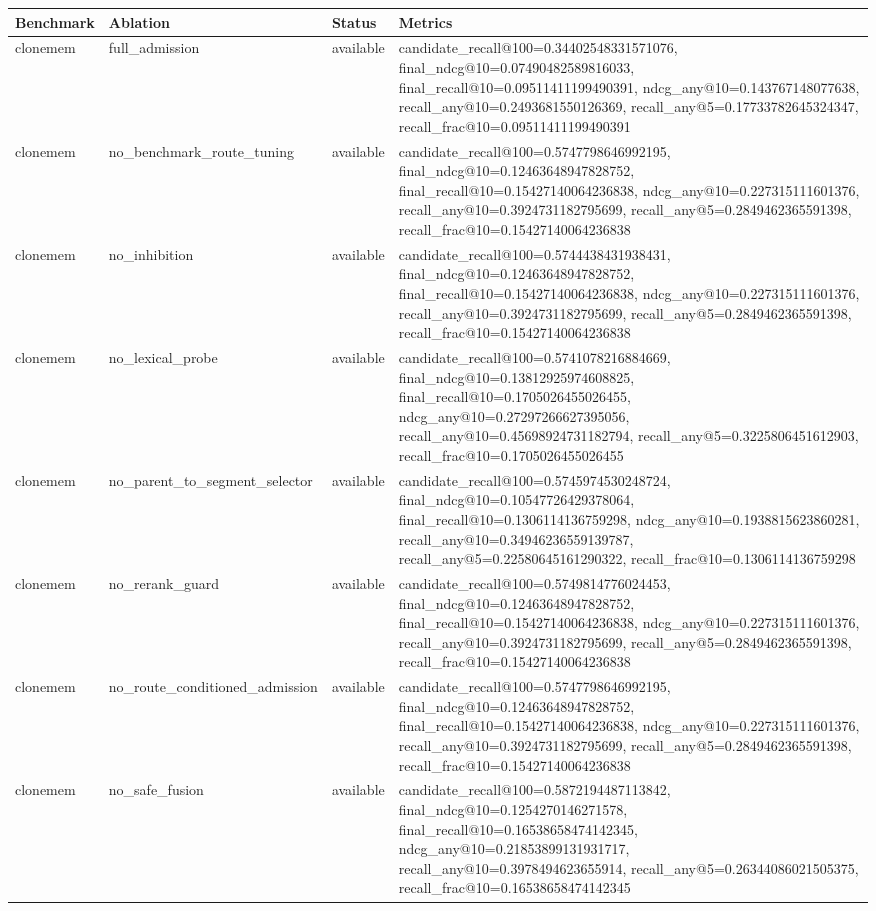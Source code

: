 \begin{tabular}{llll}
\toprule
Benchmark & Ablation & Status & Metrics \\
\midrule
clonemem & full_admission & available & candidate_recall@100=0.34402548331571076, final_ndcg@10=0.07490482589816033, final_recall@10=0.09511411199490391, ndcg_any@10=0.143767148077638, recall_any@10=0.2493681550126369, recall_any@5=0.17733782645324347, recall_frac@10=0.09511411199490391 \\
clonemem & no_benchmark_route_tuning & available & candidate_recall@100=0.5747798646992195, final_ndcg@10=0.12463648947828752, final_recall@10=0.15427140064236838, ndcg_any@10=0.227315111601376, recall_any@10=0.3924731182795699, recall_any@5=0.2849462365591398, recall_frac@10=0.15427140064236838 \\
clonemem & no_inhibition & available & candidate_recall@100=0.5744438431938431, final_ndcg@10=0.12463648947828752, final_recall@10=0.15427140064236838, ndcg_any@10=0.227315111601376, recall_any@10=0.3924731182795699, recall_any@5=0.2849462365591398, recall_frac@10=0.15427140064236838 \\
clonemem & no_lexical_probe & available & candidate_recall@100=0.5741078216884669, final_ndcg@10=0.13812925974608825, final_recall@10=0.1705026455026455, ndcg_any@10=0.27297266627395056, recall_any@10=0.45698924731182794, recall_any@5=0.3225806451612903, recall_frac@10=0.1705026455026455 \\
clonemem & no_parent_to_segment_selector & available & candidate_recall@100=0.5745974530248724, final_ndcg@10=0.10547726429378064, final_recall@10=0.1306114136759298, ndcg_any@10=0.1938815623860281, recall_any@10=0.34946236559139787, recall_any@5=0.22580645161290322, recall_frac@10=0.1306114136759298 \\
clonemem & no_rerank_guard & available & candidate_recall@100=0.5749814776024453, final_ndcg@10=0.12463648947828752, final_recall@10=0.15427140064236838, ndcg_any@10=0.227315111601376, recall_any@10=0.3924731182795699, recall_any@5=0.2849462365591398, recall_frac@10=0.15427140064236838 \\
clonemem & no_route_conditioned_admission & available & candidate_recall@100=0.5747798646992195, final_ndcg@10=0.12463648947828752, final_recall@10=0.15427140064236838, ndcg_any@10=0.227315111601376, recall_any@10=0.3924731182795699, recall_any@5=0.2849462365591398, recall_frac@10=0.15427140064236838 \\
clonemem & no_safe_fusion & available & candidate_recall@100=0.5872194487113842, final_ndcg@10=0.1254270146271578, final_recall@10=0.16538658474142345, ndcg_any@10=0.21853899131931717, recall_any@10=0.3978494623655914, recall_any@5=0.26344086021505375, recall_frac@10=0.16538658474142345 \\

\end{tabular}
